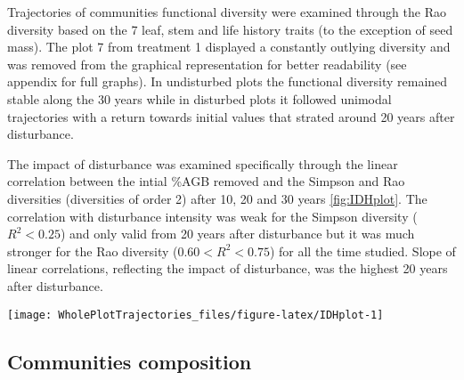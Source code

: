 \documentclass[fleqn,10pt]{ArtEcoFoG} %
\theoremstyle{definition}
\theoremstyle{definition}
\theoremstyle{definition}
\theoremstyle{remark}
\begin{document}
Trajectories of communities functional diversity were examined through
the Rao diversity based on the 7 leaf, stem and life history traits (to
the exception of seed mass). The plot 7 from treatment 1 displayed a
constantly outlying diversity and was removed from the graphical
representation for better readability (see appendix for full graphs). In
undisturbed plots the functional diversity remained stable along the 30
years while in disturbed plots it followed unimodal trajectories with a
return towards initial values that strated around 20 years after
disturbance.

The impact of disturbance was examined specifically through the linear
correlation between the intial \%AGB removed and the Simpson and Rao
diversities (diversities of order 2) after 10, 20 and 30 years
\ref{fig:IDHplot}. The correlation with disturbance intensity was weak
for the Simpson diversity (\(R^2<0.25\)) and only valid from 20 years
after disturbance but it was much stronger for the Rao diversity
(\(0.60<R^2<0.75\)) for all the time studied. Slope of linear
correlations, reflecting the impact of disturbance, was the highest 20
years after disturbance.

\begin{figure*}

{\centering \texttt{[image: WholePlotTrajectories\_files/figure-latex/IDHplot-1]} 

}

\caption{Upper panels, Trajectories of the Simpson taxonomic diversity \textbf{(a)} and Rao functional diversity \textbf{(b)} over 30 years after disturbance, corresponding to the median and 0.025 and 0.975 percentile observed after 50 iteration of the taxonomic uncertainty propagation and the missing trait value filling processes. Initial treatments are represented by solid lines colors with green for control, blue for T1,orange for T2 and red for T3. Lower panels, Relationship between the initial \%AGB removed and the median values of Simpson \textbf{(c)} and Rao \textbf{(d)} diversities at three times after disturbance. Solid lines colors represent the time, 10 years (yellow), 20 years (orange) and 30 years (brown) after disturbance.}\label{fig:IDHplot}
\end{figure*}

\subsection{Communities composition}\label{communities-composition}
\end{document}
